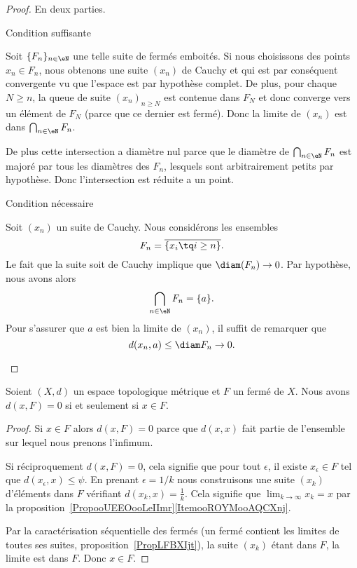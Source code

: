 \begin{proof}
	En deux parties.
	\begin{subproof}
		\item[Condition suffisante]

		Soit \( \{ F_n \}_{n\in \eN}\) une telle suite de fermés emboités. Si nous choisissons des points \( x_n\in F_n\), nous obtenons une suite \( (x_n)\) de Cauchy et qui est par conséquent convergente vu que l'espace est par hypothèse complet. De plus, pour chaque \( N\geq n\), la queue de suite \( (x_n)_{n\geq N}\) est contenue dans \( F_N\) et donc converge vers un élément de \( F_N\) (parce que ce dernier est fermé). Donc la limite de \( (x_n)\) est dans \( \bigcap_{n\in \eN}F_n\).

		De plus cette intersection a diamètre nul parce que le diamètre de \( \bigcap_{n\in \eN}F_n\) est majoré par tous les diamètres des \( F_n\), lesquels sont arbitrairement petits par hypothèse. Donc l'intersection est réduite a un point.

		\item[Condition nécessaire]

		Soit \( (x_n)\) un suite de Cauchy. Nous considérons les ensembles
		\begin{equation}
			F_n=\overline{ \{ x_i\tq i\geq n \} }.
		\end{equation}
		Le fait que la suite soit de Cauchy implique que \( \diam(F_n)\to 0\). Par hypothèse, nous avons alors
		\begin{equation}
			\bigcap_{n\in \eN}F_n=\{ a \}.
		\end{equation}
		Pour s'assurer que \( a\) est bien la limite de \( (x_n)\), il suffit de remarquer que
		\begin{equation}
			d(x_n,a)\leq \diam F_n\to 0.
		\end{equation}
	\end{subproof}
\end{proof}

\begin{proposition}     \label{PropGULUooNzqZKj}
	Soient \( (X,d) \) un espace topologique métrique et \( F\) un fermé de \( X\). Nous avons \( d(x,F)=0\) si et seulement si \( x\in F\).
\end{proposition}

\begin{proof}
	Si \( x\in F\) alors \( d(x,F)=0\) parce que \( d(x,x)\) fait partie de l'ensemble sur lequel nous prenons l'infimum.

	Si réciproquement \( d(x,F)=0\), cela signifie que pour tout \( \epsilon\), il existe \( x_{\epsilon}\in F\) tel que \( d(x_{\epsilon},x)\leq \psi\). En prenant \(\epsilon=1/k\) nous construisons une suite \( (x_k)\) d'éléments dans \( F\) vérifiant \( d(x_k,x)=\frac{1}{ k }\). Cela signifie que \( \lim_{k\to \infty} x_k=x\) par la proposition~\ref{PropooUEEOooLeIImr}\ref{ItemooROYMooAQCXnj}.

	Par la caractérisation séquentielle des fermés (un fermé contient les limites de toutes ses suites, proposition~\ref{PropLFBXIjt}), la suite \( (x_k)\) étant dans \( F\), la limite est dans \( F\). Donc \( x\in F\).
\end{proof}


